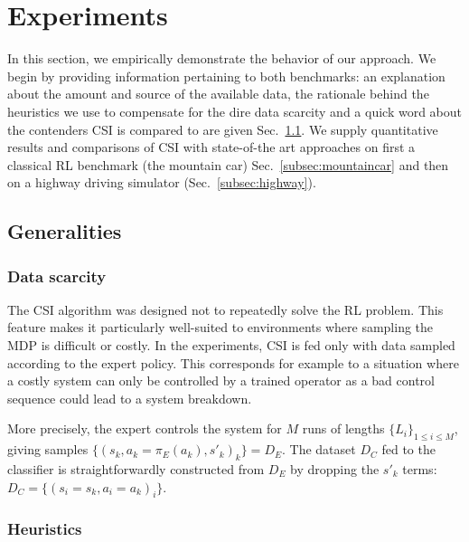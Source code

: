 \documentclass{llncs}
\begin{document}
\section{Experiments}
\label{sec:experiments}
In this section, we empirically demonstrate the behavior of our approach. We begin by providing information pertaining to both benchmarks: an explanation about the amount and source of the available data, the rationale behind the heuristics we use to compensate for the dire data scarcity and a quick word about the contenders CSI is compared to are given Sec.~\ref{subsec:generalities}. We supply quantitative results and comparisons of CSI with state-of-the art approaches on first a classical RL benchmark (the mountain car) Sec.~\ref{subsec:mountaincar} and then on a highway driving simulator (Sec.~\ref{subsec:highway}).
\subsection{Generalities}
\label{subsec:generalities}
\subsubsection{Data scarcity}
\label{subsubsec:data}
The CSI algorithm was designed not to repeatedly solve the RL problem. This feature makes it particularly well-suited to environments where sampling the MDP is difficult or costly. In the experiments, CSI is fed only with data sampled according to the expert policy. This corresponds for example to a situation where a costly system can only be controlled by a trained operator as a bad control sequence could lead to a system breakdown.

More precisely, the expert controls the system for $M$ runs of lengths $\{L_i\}_{1\leq i \leq M}$, %
giving samples $\{(s_k,a_k=\pi_E(a_k),s'_k)_k\} = D_E$. The dataset $D_C$ fed to the classifier is straightforwardly constructed from $D_E$ by dropping the $s'_k$ terms:
$  D_C = \{(s_i = s_k,a_i=a_k)_i\}$.
\subsubsection{Heuristics}
\label{subsubsec:heuristics}
\end{document}
